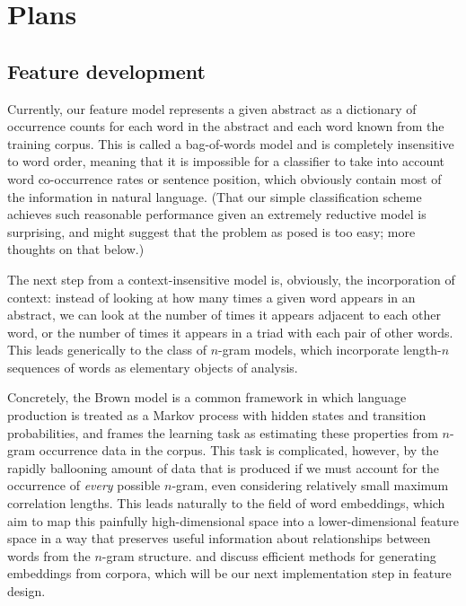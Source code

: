 \documentclass{article}
\begin{document}
\section{Plans}
\subsection{Feature development}
Currently, our feature model represents a given abstract as a dictionary of occurrence counts for each word in the abstract and each word known from the training corpus.
This is called a bag-of-words model and is completely insensitive to word order, meaning that it is impossible for a classifier to take into account word co-occurrence rates or sentence position, which obviously contain most of the information in natural language.
(That our simple classification scheme achieves such reasonable performance given an extremely reductive model is surprising, and might suggest that the problem as posed is too easy; more thoughts on that below.)

The next step from a context-insensitive model is, obviously, the incorporation of context: instead of looking at how many times a given word appears in an abstract, we can look at the number of times it appears adjacent to each other word, or the number of times it appears in a triad with each pair of other words. This leads generically to the class of $n$-gram models, which incorporate length-$n$ sequences of words as elementary objects of analysis.

Concretely, the Brown model is a common framework in which language production is treated as a Markov process with hidden states and transition probabilities, and frames the learning task as estimating these properties from $n$-gram occurrence data in the corpus.
This task is complicated, however, by the rapidly ballooning amount of data that is produced if we must account for the occurrence of \emph{every} possible $n$-gram, even considering relatively small maximum correlation lengths.
This leads naturally to the field of word embeddings, which aim to map this painfully high-dimensional space into a lower-dimensional feature space in a way that preserves useful information about relationships between words from the $n$-gram structure.
\citet{stratos2015model} and \citet{stratos2014spectral} discuss efficient methods for generating embeddings from corpora, which will be our next implementation step in feature design.
\end{document}
